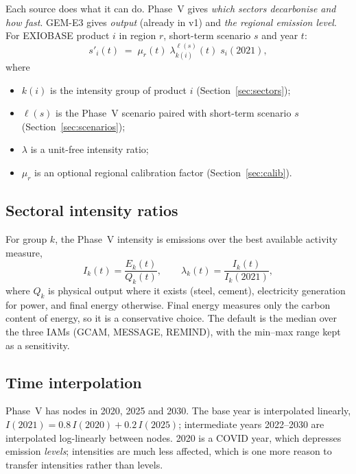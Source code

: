\documentclass[11pt,a4paper]{article}
\begin{document}
Each source does what it can do. Phase~V gives \emph{which sectors decarbonise
and how fast}. GEM-E3 gives \emph{output} (already in v1) and \emph{the
regional emission level}. For EXIOBASE product $i$ in region $r$, short-term
scenario $s$ and year $t$:
\begin{equation}
  s'_i(t) \;=\; \mu_r(t)\;\lambda^{\ell(s)}_{k(i)}(t)\; s_i(2021),
  \label{eq:main}
\end{equation}
where
\begin{itemize}
  \item $k(i)$ is the intensity group of product $i$ (Section~\ref{sec:sectors});
  \item $\ell(s)$ is the Phase~V scenario paired with short-term scenario $s$
        (Section~\ref{sec:scenarios});
  \item $\lambda$ is a unit-free intensity ratio;
  \item $\mu_r$ is an optional regional calibration factor (Section~\ref{sec:calib}).
\end{itemize}

\subsection{Sectoral intensity ratios}

For group $k$, the Phase~V intensity is emissions over the best available
activity measure,
\begin{equation}
  I_k(t) = \frac{E_k(t)}{Q_k(t)}, \qquad
  \lambda_k(t) = \frac{I_k(t)}{I_k(2021)},
\end{equation}
where $Q_k$ is physical output where it exists (steel, cement), electricity
generation for power, and final energy otherwise. Final energy measures only
the carbon content of energy, so it is a conservative choice. The default is
the median over the three IAMs (GCAM, MESSAGE, REMIND), with the min--max
range kept as a sensitivity.

\subsection{Time interpolation}

Phase~V has nodes in 2020, 2025 and 2030. The base year is interpolated
linearly, $I(2021) = 0.8\,I(2020) + 0.2\,I(2025)$; intermediate years
2022--2030 are interpolated log-linearly between nodes. 2020 is a COVID year,
which depresses emission \emph{levels}; intensities are much less affected,
which is one more reason to transfer intensities rather than levels.
\end{document}
